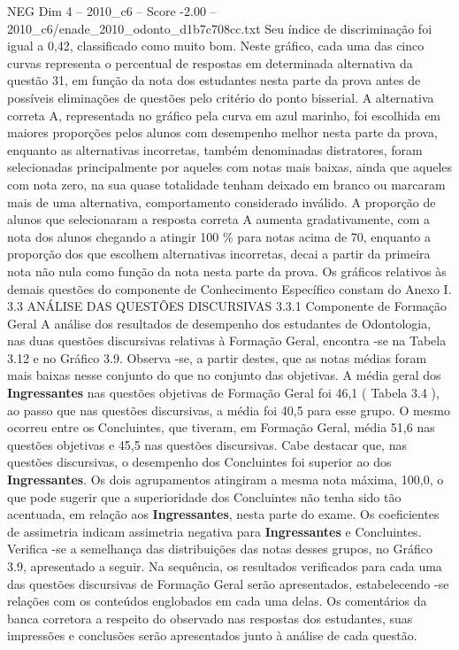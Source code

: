\begin{textsample}{NEG Dim 4 – 2010\_c6 – Score -2.00 – 2010\_c6/enade\_2010\_odonto\_d1b7c708cc.txt}
Seu índice de discriminação foi igual a 0,42, classificado como muito bom.
Neste gráfico, cada uma das cinco curvas representa o percentual de respostas em determinada alternativa da questão 31, em função da nota dos estudantes nesta parte da prova antes de possíveis eliminações de questões pelo critério do ponto bisserial.
A alternativa correta A, representada no gráfico pela curva em azul marinho, foi escolhida em maiores proporções pelos alunos com desempenho melhor nesta parte da prova, enquanto as alternativas incorretas, também denominadas distratores, foram selecionadas principalmente por aqueles com notas mais baixas, ainda que aqueles com nota zero, na sua quase totalidade tenham deixado em branco ou marcaram mais de uma alternativa, comportamento considerado inválido.
A proporção de alunos que selecionaram a resposta correta A aumenta gradativamente, com a nota dos alunos chegando a atingir 100 \% para notas acima de 70, enquanto a proporção dos que escolhem alternativas incorretas, decai a partir da primeira nota não nula como função da nota nesta parte da prova.
Os gráficos relativos às demais questões do componente de Conhecimento Específico constam do Anexo I. 3.3 ANÁLISE DAS QUESTÕES DISCURSIVAS 3.3.1 Componente de Formação Geral A análise dos resultados de desempenho dos estudantes de Odontologia, nas duas questões discursivas relativas à Formação Geral, encontra -se na Tabela 3.12 e no Gráfico 3.9.
Observa -se, a partir destes, que as notas médias foram mais baixas nesse conjunto do que no conjunto das objetivas.
A média geral dos \textbf{Ingressantes} nas questões objetivas de Formação Geral foi 46,1 ( Tabela 3.4 ), ao passo que nas questões discursivas, a média foi 40,5 para esse grupo.
O mesmo ocorreu entre os Concluintes, que tiveram, em Formação Geral, média 51,6 nas questões objetivas e 45,5 nas questões discursivas.
Cabe destacar que, nas questões discursivas, o desempenho dos Concluintes foi superior ao dos \textbf{Ingressantes}.
Os dois agrupamentos atingiram a mesma nota máxima, 100,0, o que pode sugerir que a superioridade dos Concluintes não tenha sido tão acentuada, em relação aos \textbf{Ingressantes}, nesta parte do exame.
Os coeficientes de assimetria indicam assimetria negativa para \textbf{Ingressantes} e Concluintes.
Verifica -se a semelhança das distribuições das notas desses grupos, no Gráfico 3.9, apresentado a seguir.
Na sequência, os resultados verificados para cada uma das questões discursivas de Formação Geral serão apresentados, estabelecendo -se relações com os conteúdos englobados em cada uma delas.
Os comentários da banca corretora a respeito do observado nas respostas dos estudantes, suas impressões e conclusões serão apresentados junto à análise de cada questão.

\end{textsample}
